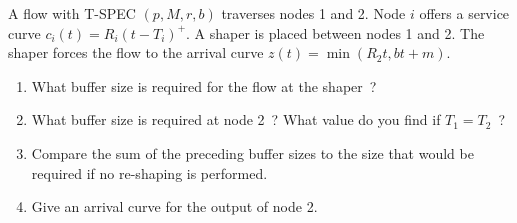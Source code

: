 \begin{problem}
A flow with T-SPEC $(p,M,r,b)$ traverses nodes 1 and 2.  Node $i$
offers a service curve $c_{i}(t) = R_{i}(t-T_{i})^{+}$. A shaper
is placed between nodes 1 and 2. The shaper forces the flow to the
arrival curve $z(t)=\min(R_{2}t, bt+m)$.
\begin{enumerate}

\item
What buffer size is required for the flow at the shaper~? 
\item
What buffer size is required at node 2~? What value do you find if
$T_{1}=T_{2}$~?
\item Compare the sum of the preceding buffer sizes to the size
that would be required if no re-shaping is performed.
\item Give an arrival curve for the output of node 2.
\end{enumerate}

\end{problem}
